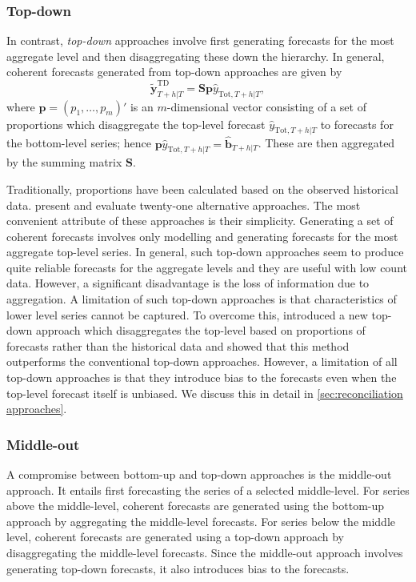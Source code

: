 \documentclass[graybox]{svmult}
\begin{document}
\subsubsection{Top-down}

In contrast, \textit{top-down} approaches involve first generating forecasts for the most aggregate level and then disaggregating these down the hierarchy. In general, coherent forecasts generated from top-down approaches are given by
\begin{equation*}
	\tilde{\bm{y}}^{\text{TD}}_{T+h|T}=\bm{S}\bm{p}\hat{y}_{\text{Tot}, T+h|T},
\end{equation*}
where $\bm{p} = (p_1,\dots,p_m)'$ is an $m$-dimensional vector consisting of a set of proportions which disaggregate the top-level forecast $\hat{y}_{\text{Tot}, T+h|T}$ to forecasts for the bottom-level series; hence $\bm{p}\hat{y}_{\text{Tot}, T+h|T}=\bm{\hat{\bm{b}}}_{T+h|T}$. These are then aggregated by the summing matrix $\bm{S}$.

Traditionally, proportions have been calculated based on the observed historical data. \citet{gross1990} present and evaluate twenty-one alternative approaches. The most convenient attribute of these approaches is their simplicity. Generating a set of coherent forecasts involves only modelling and generating forecasts for the most aggregate top-level series. In general, such top-down approaches seem to produce quite reliable forecasts for the aggregate levels and they are useful with low count data. However, a significant disadvantage is the loss of information due to aggregation. A limitation of such top-down approaches is that characteristics of lower level series cannot be captured. To overcome this, \citet{AthEtAl2009} introduced a new top-down approach which disaggregates the top-level based on proportions of forecasts rather than the historical data and showed that this method outperforms the conventional top-down approaches. However, a limitation of all top-down approaches is that they introduce bias to the forecasts even when the top-level forecast itself is unbiased. We discuss this in detail in \autoref{sec:reconciliation approaches}.

\subsubsection{Middle-out}

A compromise between bottom-up and top-down approaches is the middle-out approach. It entails first forecasting the series of a selected middle-level. For series above the middle-level, coherent forecasts are generated using the bottom-up approach by aggregating the middle-level forecasts. For series below the middle level, coherent forecasts are generated using a top-down approach by disaggregating the middle-level forecasts. Since the middle-out approach involves generating top-down forecasts, it also introduces bias to the forecasts.
\end{document}
